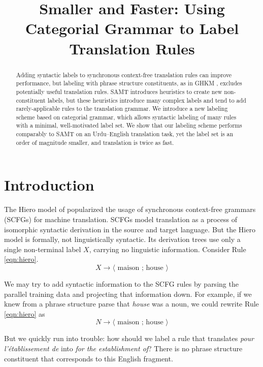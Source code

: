 \documentclass[a4paper]{article}
\author{
\anonymize{
Jonathan Weese \and Chris Callison-Burch \and Adam Lopez\\
Department of Computer Science\\
Human Language Technology Center of Excellence\\ %
Johns Hopkins University\\
Baltimore, MD 21218 USA\\
{\tt \{jonny,ccb,alopez\}@cs.jhu.edu}}
}
\title{Smaller and Faster: Using Categorial Grammar to Label Translation Rules}
\begin{document}
\maketitle

\begin{abstract}
Adding syntactic labels to synchronous context-free translation rules can improve performance, but labeling with phrase structure constituents, as in GHKM \cite{ghkm}, excludes potentially useful translation rules. SAMT \cite{samt-wmt06} introduces heuristics to create new non-constituent labels, but these heuristics introduce many complex labels and tend to add rarely-applicable rules to the translation grammar. We introduce a new labeling scheme based on categorial grammar, which allows syntactic labeling of many rules with a minimal, well-motivated label set. We show that our labeling scheme performs comparably to SAMT on an Urdu--English translation task, yet the label set is an order of magnitude smaller, and translation is twice as fast.
\end{abstract}

\section{Introduction}

The Hiero model of  popularized the usage of synchronous context-free grammars (SCFGs) for machine translation. SCFGs model translation as a process of isomorphic syntactic derivation in the source and target language. But the Hiero model is formally, not linguistically syntactic. Its derivation trees use only a single non-terminal label $X$, carrying no linguistic information. Consider Rule \ref{eqn:hiero}.
\begin{equation}
X \to \langle \textrm{ maison ; house } \rangle\label{eqn:hiero}
\end{equation}

We may try to add syntactic information to the SCFG rules by parsing the parallel training data and projecting that information down. For example, if we knew from a phrase structure parse that {\em house} was a noun, we could rewrite Rule \ref{eqn:hiero} as
\begin{equation*}
N \to \langle \textrm{ maison ; house } \rangle
\end{equation*}

But we quickly run into trouble: how should we label a rule that translates {\em pour l'\'{e}tablissement de} into {\em for the establishment of}? There is no phrase structure constituent that corresponds to this English fragment.
\end{document}
